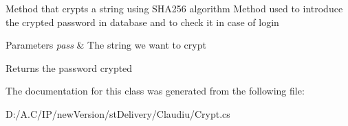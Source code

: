 Method that crypts a string using S\+H\+A256 algorithm Method used to introduce the crypted password in database and to check it in case of login 


\begin{DoxyParams}{Parameters}
{\em pass} & The string we want to crypt\\
\hline
\end{DoxyParams}
\begin{DoxyReturn}{Returns}
the password crypted
\end{DoxyReturn}


The documentation for this class was generated from the following file\+:\begin{DoxyCompactItemize}
\item 
D\+:/\+A.\+C/\+I\+P/new\+Version/st\+Delivery/\+Claudiu/Crypt.\+cs\end{DoxyCompactItemize}
